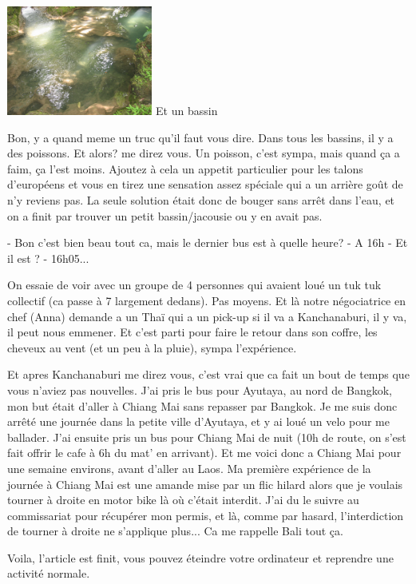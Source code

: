 \begin{multicols}{2}
\hspace*{-0.65cm}
\includegraphics[width=4.8cm]{articles/Kanchanaburi/1438.jpg}
Et un bassin

Bon, y a quand meme un truc qu'il faut vous dire. Dans tous les bassins, il y a des poissons. Et alors? me direz vous. Un poisson, c'est sympa, mais quand ça a faim, ça l'est moins. Ajoutez à cela un appetit particulier pour les talons d'européens et vous en tirez une sensation assez spéciale qui a un arrière goût de n'y reviens pas. La seule solution était donc de bouger sans arrêt dans l'eau, et on a finit par trouver un petit bassin/jacousie ou y en avait pas.

- Bon c'est bien beau tout ca, mais le dernier bus est à quelle heure?
- A 16h
- Et il est ?
- 16h05...

On essaie de voir avec un groupe de 4 personnes qui avaient loué un tuk tuk collectif (ca passe à 7 largement dedans). Pas moyens. Et là notre négociatrice en chef (Anna) demande a un Thaï qui a un pick-up si il va a Kanchanaburi, il y va, il peut nous emmener. Et c'est parti pour faire le retour dans son coffre, les cheveux au vent (et un peu à la pluie), sympa l'expérience.

Et apres Kanchanaburi me direz vous, c'est vrai que ca fait un bout de temps que vous n'aviez pas nouvelles. J'ai pris le bus pour Ayutaya, au nord de Bangkok, mon but était d'aller à Chiang Mai sans repasser par Bangkok. Je me suis donc arrêté une journée dans la petite ville d'Ayutaya, et y ai loué un velo pour me ballader. J'ai ensuite pris un bus pour Chiang Mai de nuit (10h de route, on s'est fait offrir le cafe à 6h du mat' en arrivant). Et me voici donc a Chiang Mai pour une semaine environs, avant d'aller au Laos. Ma première expérience de la journée à Chiang Mai est une amande mise par un flic hilard alors que je voulais tourner à droite en motor bike là où c'était interdit. J'ai du le suivre au commissariat pour récupérer mon permis, et là, comme par hasard, l'interdiction de tourner à droite ne s'applique plus... Ca me rappelle Bali tout ça.

Voila, l'article est finit, vous pouvez éteindre votre ordinateur et reprendre une activité normale.

\end{multicols}
